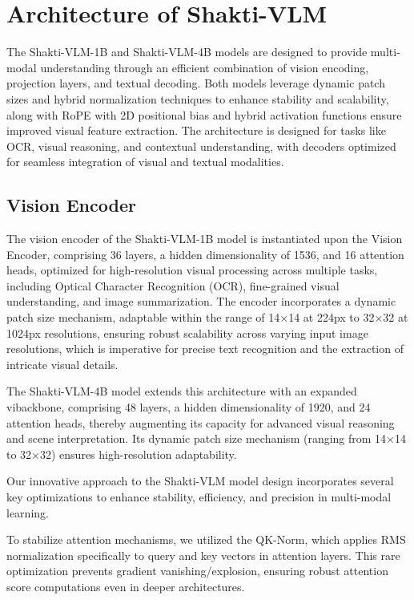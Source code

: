\documentclass{article}
\begin{document}
\section{Architecture of Shakti-VLM }
The Shakti-VLM-1B and Shakti-VLM-4B models are designed to provide multi-modal understanding through an efficient combination of vision encoding, projection layers, and textual decoding. Both models leverage dynamic patch sizes and hybrid normalization techniques to enhance stability and scalability, along with RoPE\cite{su2023roformerenhancedtransformerrotaryrope} with 2D positional bias and hybrid activation functions ensure improved visual feature extraction. The architecture is designed for tasks like OCR, visual reasoning, and contextual understanding, with decoders optimized for seamless integration of visual and textual modalities. 

\subsection{Vision Encoder}
The vision encoder of the Shakti-VLM-1B model is instantiated upon the Vision Encoder\cite{dosovitskiy2021imageworth16x16wordsvit}, comprising 36 layers, a hidden dimensionality of 1536, and 16 attention heads, optimized for high-resolution visual processing across multiple tasks, including Optical Character Recognition (OCR), fine-grained visual understanding, and image summarization. The encoder incorporates a dynamic patch size mechanism, adaptable within the range of 14×14 at 224px to 32×32 at 1024px resolutions, ensuring robust scalability across varying input image resolutions, which is imperative for precise text recognition and the extraction of intricate visual details. 

The Shakti-VLM-4B model extends this architecture with an expanded vibackbone, comprising 48 layers, a hidden dimensionality of 1920, and 24 attention heads, thereby augmenting its capacity for advanced visual reasoning and scene interpretation. Its dynamic patch size mechanism (ranging from 14×14 to 32×32) ensures high-resolution adaptability. 

Our innovative approach to the Shakti-VLM model design incorporates several key optimizations to enhance stability, efficiency, and precision in multi-modal learning. 

To stabilize attention mechanisms, we utilized the QK-Norm\cite{henry2020querykeynormalizationtransformers}, which applies RMS\cite{zhang2019rootmeansquarelayer} normalization specifically to query and key vectors in attention layers. This rare optimization prevents gradient vanishing/explosion, ensuring robust attention score computations even in deeper architectures. 
\end{document}
